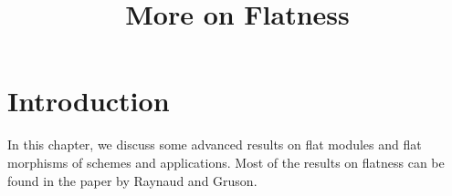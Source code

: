 

%


\title{More on Flatness}

\maketitle

\label{section-phantom}

\tableofcontents



\section{Introduction}
\label{section-introduction}

\noindent
In this chapter, we discuss some advanced results on flat modules and
flat morphisms of schemes and applications. Most of the results on flatness
can be found in the paper \cite{GruRay} by Raynaud and Gruson.

